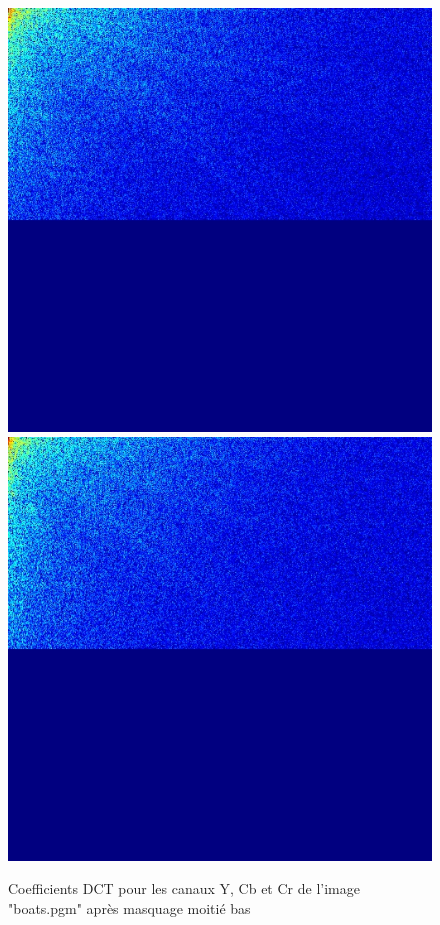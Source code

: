 \documentclass[12pt]{report}
\begin{document}
\begin{figure}[H]
\begin{center}
\includegraphics[scale=0.25]{../ImageRes/dct_masked2_1.jpg} 
\includegraphics[scale=0.25]{../ImageRes/dct_masked2_2.jpg} 
\caption{Coefficients DCT pour les canaux Y, Cb et Cr de l'image "boats.pgm" après masquage moitié bas}
\end{center}
\end{figure}
\end{document}
